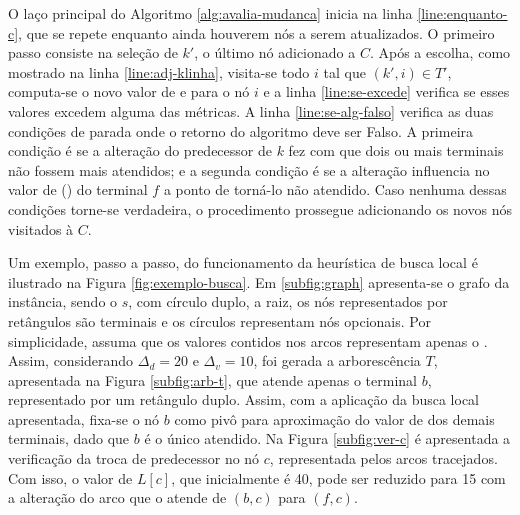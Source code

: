 O  laço   principal  do  Algoritmo  \ref{alg:avalia-mudanca}   inicia  na  linha
\eqref{line:enquanto-c},  que se  repete  enquanto ainda  houverem  nós a  serem
atualizados.  O  primeiro  passo  consiste  na seleção  de  $k'$,  o  último  nó
adicionado    a   $C$.    Após    a   escolha,    como    mostrado   na    linha
\eqref{line:adj-klinha}, visita-se todo $i$ tal que $(k', i) \in T'$, computa-se
o   novo  valor   de  {\delay}   e  {\jitter}   para  o   nó  $i$   e  a   linha
\eqref{line:se-excede} verifica se esses valores  excedem alguma das métricas. A
linha  \eqref{line:se-alg-falso} verifica  as duas  condições de  parada onde  o
retorno do  algoritmo deve ser  Falso. A primeira condição  é se a  alteração do
predecessor de $k$ fez com que dois ou mais terminais não fossem mais atendidos;
e  a  segunda  condição  é  se  a alteração  influencia  no  valor  de  {\delay}
({\jitter})  do terminal  $f$ a  ponto de  torná-lo não  atendido. Caso  nenhuma
dessas condições  torne-se verdadeira,  o procedimento prossegue  adicionando os
novos nós visitados à $C$.

Um  exemplo, passo  a passo,  do funcionamento  da heurística  de busca  local é
ilustrado na Figura  \ref{fig:exemplo-busca}. Em \ref{subfig:graph} apresenta-se
o  grafo  da  instância,  sendo  o  $s$, com  círculo  duplo,  a  raiz,  os  nós
representados  por  retângulos  são  terminais e  os  círculos  representam  nós
opcionais.  Por  simplicidade,   assuma  que  os  valores   contidos  nos  arcos
representam apenas o {\delay}. Assim, considerando $\Delta_d = 20$ e $\Delta_v =
10$, foi gerada  a arborescência $T$, apresentada  na Figura \ref{subfig:arb-t},
que atende  apenas o terminal $b$,  representado por um retângulo  duplo. Assim,
com a  aplicação da  busca local apresentada,  fixa-se o nó  $b$ como  pivô para
aproximação do valor  de {\delay} dos demais  terminais, dado que $b$  é o único
atendido. Na Figura  \ref{subfig:ver-c} é apresentada a verificação  da troca de
predecessor no nó $c$, representada pelos arcos tracejados. Com isso, o valor de
$L[c]$, que inicialmente é 40, pode ser reduzido para 15 com a alteração do arco
que o atende de $(b, c)$ para $(f, c)$.

